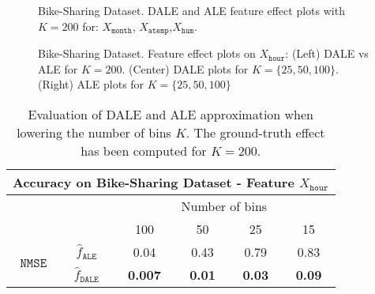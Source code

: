 \documentclass[wcp]{jmlr}
\newcommand{\dale}{\hat{f}_{\mathtt{DALE}}}
\newcommand{\alep}{\hat{f}_{\mathtt{ALE}}}
\begin{document}
\begin{figure}[h]
  \centering
  \resizebox{.3\columnwidth}{!}{}
  \resizebox{.3\columnwidth}{!}{}
  \resizebox{.3\columnwidth}{!}{}
  \caption{Bike-Sharing Dataset. DALE and ALE feature effect plots with \(K=200\) for: \(X_{\texttt{month}}\), \(X_{\mathtt{atemp}}\),\(X_{\mathtt{hum}}\).}
  \label{fig:bike-sharing-comparison}
\end{figure}


\begin{figure}[h]
  \centering
  \resizebox{.3\columnwidth}{!}{}
  \resizebox{.3\columnwidth}{!}{}
  \resizebox{.3\columnwidth}{!}{}
  \caption{Bike-Sharing Dataset. Feature effect plots on \(X_{\texttt{hour}}\): (Left) DALE vs ALE for \(K=200\). (Center) DALE plots for \(K = \{25, 50, 100\}\). (Right) ALE plots for \(K = \{25, 50, 100\}\)}
  \label{fig:bike-sharing-feature-3}
\end{figure}


\begin{table}
  \caption{Evaluation of DALE and ALE approximation when lowering the number of bins \(K\). The ground-truth effect has been computed for \(K=200\).}
  \label{tab:bike-sharing-accuracy} \centering
  \begin{tabular}{c|c|c|c|c|c}
    \multicolumn{6}{c}{Accuracy on Bike-Sharing Dataset - Feature \(X_{\mathtt{hour}}\)} \\
    \hline \hline & & \multicolumn{4}{|c}{Number of bins} \\
    \hline & & 100 & 50 & 25 & 15 \\
    \hline \hline \multirow{2}{*}{\(\mathtt{NMSE}\)} & \(\alep\) & 0.04 & 0.43 & 0.79 & 0.83 \\
                  & \(\dale\) & \textbf{0.007} & \textbf{0.01} & \textbf{0.03} & \textbf{0.09} \\
    \hline
  \end{tabular}
\end{table}
\end{document}

